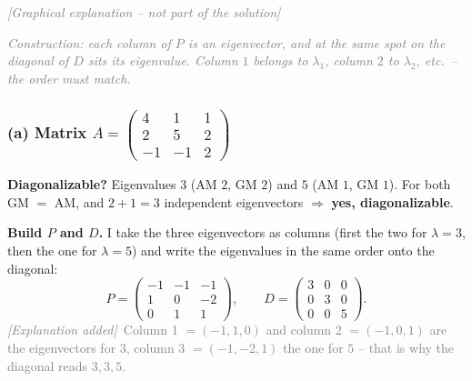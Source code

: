\documentclass[a4paper,12pt]{article}
\newcommand{\grafik}{\textcolor{gray}{\small\textit{[Graphical explanation -- not part of the solution]}}}
\newcommand{\erglerk}{\textcolor{gray}{\small\textit{[Explanation added]}}}
\newcommand{\EW}{eigenvalue}
\newcommand{\EV}{eigenvector}
\begin{document}
\grafik

\begin{center}
\end{center}

\textcolor{gray}{\small\textit{Construction: each column of $P$ is an \EV{}, and at the same spot on the diagonal of $D$ sits its \EW{}. Column $1$ belongs to $\lambda_1$, column $2$ to $\lambda_2$, etc.\ -- the order must match.}}

\subsubsection*{(a) Matrix $A = \left(\begin{smallmatrix} 4 & 1 & 1 \\ 2 & 5 & 2 \\ -1 & -1 & 2 \end{smallmatrix}\right)$}

\textbf{Diagonalizable?} Eigenvalues $3$ (AM $2$, GM $2$) and $5$ (AM $1$, GM $1$). For both GM $=$ AM, and $2 + 1 = 3$ independent eigenvectors $\Rightarrow$ \textbf{yes, diagonalizable}.

\textbf{Build $P$ and $D$.} I take the three eigenvectors as columns (first the two for $\lambda = 3$, then the one for $\lambda = 5$) and write the eigenvalues in the same order onto the diagonal:
\[
P = \begin{pmatrix} -1 & -1 & -1 \\ 1 & 0 & -2 \\ 0 & 1 & 1 \end{pmatrix}, \qquad
D = \begin{pmatrix} 3 & 0 & 0 \\ 0 & 3 & 0 \\ 0 & 0 & 5 \end{pmatrix}.
\]
\erglerk\ \textcolor{gray}{\small Column 1 $=(-1,1,0)$ and column 2 $=(-1,0,1)$ are the \EV{}s for $3$, column 3 $=(-1,-2,1)$ the one for $5$ -- that is why the diagonal reads $3, 3, 5$.}
\end{document}
